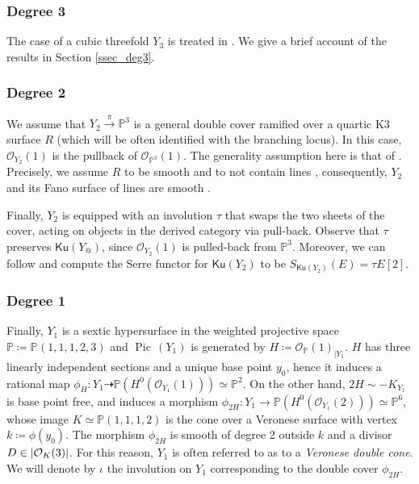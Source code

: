 \documentclass[11pt]{amsart}
\theoremstyle{definition}
\newcommand{\pr}[1]{\mathbb P^{#1}}
\DeclareMathOperator{\Pic}{Pic\,}
\newcommand{\sO}{\mathcal{O}}
\DeclarePairedDelimiter{\abs}{\lvert}{\rvert}
\newcommand{\Ku}{\mathsf{Ku}}
\renewcommand{\P}{\mathbb{P}}
\begin{document}

\subsubsection*{Degree 3} The case of a cubic threefold $Y_3$ is treated in \cite{Bayer}. We give a brief account of the results in Section \ref{ssec_deg3}.

\subsubsection*{Degree 2}
We assume that $Y_2 \xrightarrow{\pi} \P^3$ is a general double cover ramified over a quartic K3 surface $R$ (which will be often identified with the branching locus). In this case, $\sO_{Y_2}(1)$ is the pullback of $\sO_{\pr 3}(1)$. The generality assumption here is that of \cite{Wel81,TM03}. Precisely, we assume $R$ to be smooth and to not contain lines \cite[\S 1]{Wel81}, consequently, $Y_2$ and its Fano surface of lines are smooth \cite[Remark 2.2.9]{KPS18_hilbert_schemes}. 



Finally, $Y_2$ is equipped with an involution $\tau$ that swaps the two sheets of the cover, acting on objects in the derived category via pull-back.
Observe that $\tau$ preserves $\Ku(Y_@)$, since $\sO_{Y_2}(1)$ is pulled-back from $\pr 3$. Moreover, we can follow \cite{Kuz15_fractional} and compute the Serre functor for $\Ku(Y_2)$ to be $S_{\Ku(Y_2)}(E) = \tau E[2]$.

\subsubsection*{Degree 1} 

Finally, $Y_1$ is a sextic hypersurface in the weighted projective space $\mathbb P\coloneqq \pr{}(1,1,1,2,3)$ and $\Pic(Y_1)$ is generated by $H\coloneqq  \sO_{\mathbb P}(1)_{|Y_1}$. $H$ has three linearly independent sections and a unique base point $y_0$, hence it induces a rational map $\phi_H\colon Y_1 \dashrightarrow \mathbb{P}(H^0(\sO_{Y_1}(1)))\simeq \pr 2$. On the other hand, $2H\sim -K_{Y_1}$ is base point free, and induces a morphism $\phi_{2H}\colon Y_1 \to \mathbb{P}(H^0(\sO_{Y_1}(2)))\simeq\pr 6$, whose image $K\simeq \mathbb P(1,1,1,2)$ is the cone over a Veronese surface with vertex $k\coloneqq \phi(y_0)$. The morphism $\phi_{2H}$ is smooth of degree 2 outside $k$ and a divisor $D\in \abs{\sO_K(3)}$. For this reason, $Y_1$ is often referred to as to a \textit{Veronese double cone}. We will denote by $\iota$ the involution on $Y_1$ corresponding to the double cover $\phi_{2H}$.
\end{document}
